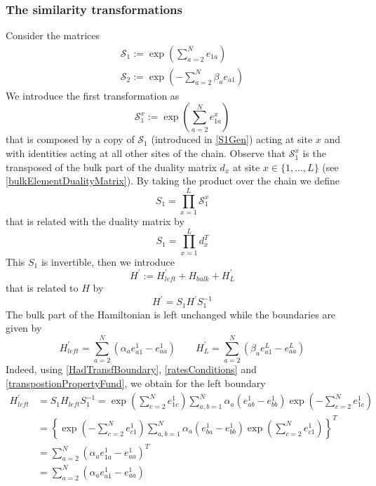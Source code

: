 \documentclass[11pt]{article}
\numberwithin{equation}{section}
\numberwithin{equation}{subsection}
\begin{document}
\subsubsection{The similarity transformations}\label{subsectionSTransf}
Consider the matrices
\begin{align}
	\mathcal{S}_{1}:=\exp{\left(\sum_{a=2}^{N}e_{1a}\right)}\label{S1Gen}\\
	\mathcal{S}_{2}:=\exp{\left(-\sum_{a=2}^{N}\beta_{a}e_{a1}\right)}\label{S2Gen}
\end{align}
We introduce the first transformation as
\begin{equation}\label{transformationV}
 \mathcal{S}_{1}^{x}:=\exp{\left(\sum_{a=2}^{N}e_{1a}^{x}\right)}%
\end{equation}
that is composed by a copy of $\mathcal{S}_{1}$ (introduced in \eqref{S1Gen}) acting at site $x$ and with identities acting at all other sites of the chain. 
Observe that $\mathcal{S}_{1}^{x}$ is the transposed of the bulk part of the duality matrix $d_{x}$  at site $x\in \{1,\ldots,L\}$ (see \eqref{bulkElementDualityMatrix}). By taking the product over the chain we define
\begin{equation}
    S_{1}=\prod_{x=1}^{L}\mathcal{S}_{1}^{x}
\end{equation}
that is related with the duality matrix by 
\begin{equation}
S_{1}=\prod_{x=1}^{L}d_{x}^{T}
\end{equation}
 This $S_{1}$ is invertible, then we introduce 
\begin{equation}\label{hatHamiltonian}
   H^{'}:=H^{'}_{left}+H_{bulk}+H^{'}_{L}
\end{equation}
that is related to $H$ by
\begin{equation}\label{similarV}
   H^{'}=S_{1}H^{'}S_{1}^{-1}
\end{equation}
The bulk part of the Hamiltonian is left unchanged while the boundaries are given by 
\begin{equation}
	H^{'}_{left}=\sum_{a=2}^{N}\left(\alpha_{a}e_{a1}^{1}-e_{aa}^{1}\right)\qquad H^{'}_{L}=\sum_{a=2}^{N}\left(\beta_{a}e_{a1}^{L}-e_{aa}^{L}\right)
\end{equation}
Indeed, using \eqref{HadTransfBoundary}, \eqref{ratesConditions} and \eqref{transpostionPropertyFund}, we obtain for the left boundary
\begin{equation}
	\begin{split}
		H_{left}^{'}&=S_{1}H_{left}S_{1}^{-1}=\exp{\left(\sum_{c=2}^{N}e_{1c}^{1}\right)}\sum_{a,b=1}^{N}\alpha_{a}\left(e_{ab}^{1}-e_{bb}^{1}\right)\exp{\left(-\sum_{c=2}^{N}e_{1c}^{1}\right)}
		\\&=
		\left\{\exp{\left(-\sum_{c=2}^{N}e_{c1}^{1}\right)}\sum_{a,b=1}^{N}\alpha_{a}\left(e_{ba}^{1}-e_{bb}^{1}\right)\exp{\left(\sum_{c=2}^{N}e_{c1}^{1}\right)}\right\}^{T}
		\\&=
		\sum_{a=2}^{N}\left(\alpha_{a}e_{1a}^{1}-e_{aa}^{1}\right)^{T}
		\\&=
		\sum_{a=2}^{N}\left(\alpha_{a}e_{a1}^{1}-e_{aa}^{1}\right)
	\end{split}
\end{equation}
\end{document}
